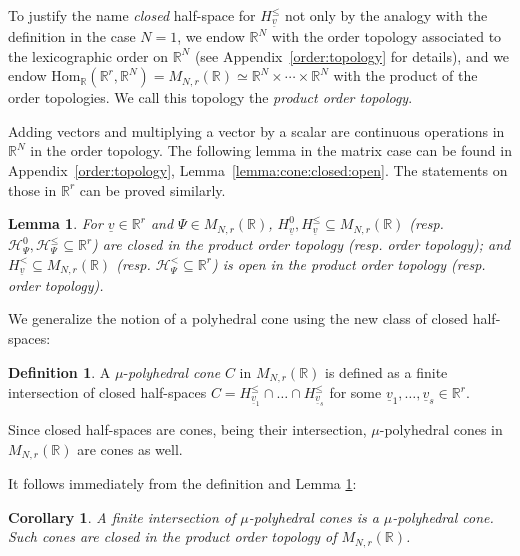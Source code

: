\documentclass[12pt, a4article]{amsart}   	%
\numberwithin{equation}{section}
\theoremstyle{plain}
\newtheorem{corollary}[theorem]{Corollary}
\newtheorem{lemma}[theorem]{Lemma}
\theoremstyle{definition}
\newtheorem{definition}[theorem]{Definition}
\newcommand{\R}{{\mathbb R}}
\newcommand{\uv}{{\underline v}}
\begin{document}
To justify the name \emph{closed} half-space for $H_{ {\uv}}^\leq$ not only by the analogy with the definition in the case $N=1$, we endow $\mathbb R^{N}$ with the order topology associated to the lexicographic order on $\mathbb R^N$ (see Appendix~\ref{order:topology} for details), and we endow $\mathrm{Hom}_\mathbb R(\mathbb R^r,\mathbb R^N)=M_{N,r}(\mathbb R)\simeq \R^N\times\cdots\times\R^N$ with the product of the order topologies. 
We call this topology the \emph{product order topology}. 

Adding vectors and multiplying a vector by a scalar are continuous operations  in $\R^N$ in the order topology. The following lemma in the matrix case can be found in Appendix~\ref{order:topology}, Lemma~\ref{lemma:cone:closed:open}. The statements on those in $\mathbb{R}^r$ can be proved similarly.


\begin{lemma}\label{Lem:Closed}
For $\underline v\in \mathbb R^r$ and $\Psi\in M_{N,r}(\mathbb{R})$, $H^0_{\uv}, H^\leq_{\uv}\subseteq M_{N,r}(\mathbb R)$ (resp. $\mathcal{H}^0_{\Psi}, \mathcal{H}^\leq_{\Psi}\subseteq \mathbb{R}^r$) are closed in the product order topology (resp. order topology);
and $H^<_{\uv}\subseteq M_{N,r}(\mathbb R)$ (resp. $\mathcal{H}^<_{\Psi}\subseteq \mathbb{R}^r$) is open in the product order topology (resp. order topology).
\end{lemma}


We generalize the notion of a polyhedral cone using the new class of closed half-spaces:

\begin{definition}\label{def:polyhedral:cone:vectors}\rm
A $\mu$-\emph{polyhedral cone} $C$ in $M_{N,r}(\mathbb R)$ is defined as a finite intersection of closed half-spaces ${C}=H_{ {\uv_1}}^\leq\cap\ldots\cap H_{ {\uv_s}}^\leq $ for some $\uv_1,\ldots, \uv_s\in \mathbb R^r$.
\end{definition}

Since closed half-spaces are cones, being their intersection, $\mu$-polyhedral cones in $M_{N,r}(\mathbb{R})$ are cones as well. %

It follows immediately from the definition and Lemma \ref{Lem:Closed}:

\begin{corollary}\label{cor:finite:intersection}
A finite intersection of $\mu$-polyhedral cones is a $\mu$-polyhedral cone. Such cones are closed in the product order topology of $M_{N,r}(\mathbb{R})$.
\end{corollary}
\end{document}
